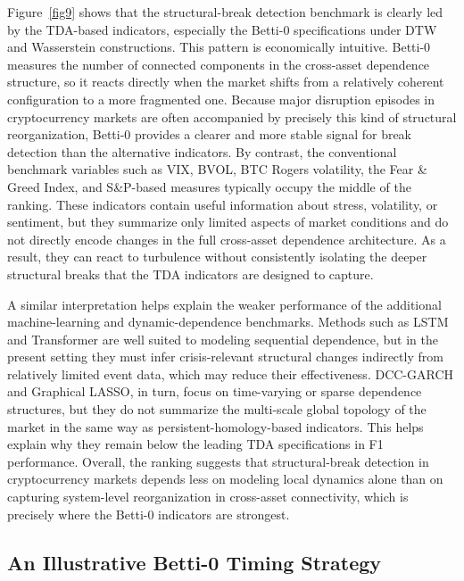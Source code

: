 \documentclass[11pt,reqno]{amsart}
\numberwithin{equation}{section} %
\begin{document}
Figure~\ref{fig9} shows that the structural-break detection benchmark is clearly led by the TDA-based indicators, especially the Betti-0 specifications under DTW and Wasserstein constructions. 
This pattern is economically intuitive. 
Betti-0 measures the number of connected components in the cross-asset dependence structure, so it reacts directly when the market shifts from a relatively coherent configuration to a more fragmented one. 
Because major disruption episodes in cryptocurrency markets are often accompanied by precisely this kind of structural reorganization, Betti-0 provides a clearer and more stable signal for break detection than the alternative indicators.
By contrast, the conventional benchmark variables such as VIX, BVOL, BTC Rogers volatility, the Fear \& Greed Index, and S\&P-based measures typically occupy the middle of the ranking. 
These indicators contain useful information about stress, volatility, or sentiment, but they summarize only limited aspects of market conditions and do not directly encode changes in the full cross-asset dependence architecture.
As a result, they can react to turbulence without consistently isolating the deeper structural breaks that the TDA indicators are designed to capture.

A similar interpretation helps explain the weaker performance of the additional machine-learning and dynamic-dependence benchmarks. 
Methods such as LSTM and Transformer are well suited to modeling sequential dependence, but in the present setting they must infer crisis-relevant structural changes indirectly from relatively limited event data, which may reduce their effectiveness. 
DCC-GARCH and Graphical LASSO, in turn, focus on time-varying or sparse dependence structures, but they do not summarize the multi-scale global topology of the market in the same way as persistent-homology-based indicators. 
This helps explain why they remain below the leading TDA specifications in F1 performance. Overall, the ranking suggests that structural-break detection in cryptocurrency markets depends less on modeling local dynamics alone than on capturing system-level reorganization in cross-asset connectivity, which is precisely where the Betti-0 indicators are strongest.

\subsection{An Illustrative Betti-0 Timing Strategy}
\end{document}
